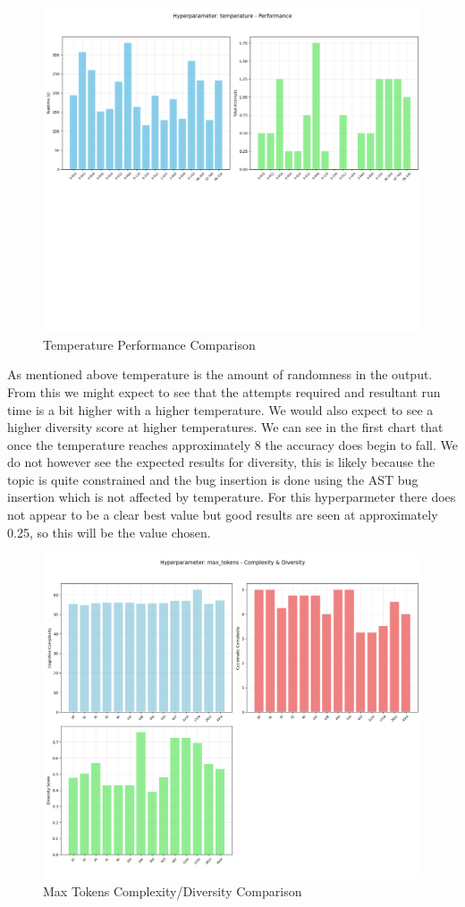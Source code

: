 \documentclass[12pt]{extarticle}
\begin{document}
\begin{figure}[H]
\centering
\includegraphics[width=0.7\linewidth]{Images/Hyperparam_temperature_Performance.png}
\caption{Temperature Performance Comparison}
\label{fig:Complexity_Comparison_Threads}
\end{figure}

As mentioned above temperature is the amount of randomness in the output. From this we might expect to see that the attempts required and resultant run time is a bit higher with a higher temperature. We would also expect to see a higher diversity score at higher temperatures. We can see in the first chart that once the temperature reaches approximately 8 the accuracy does begin to fall. We do not however see the expected results for diversity, this is likely because the topic is quite constrained and the bug insertion is done using the AST bug insertion which is not affected by temperature. For this hyperparmeter there does not appear to be a clear best value but good results are seen at approximately 0.25, so this will be the value chosen.

\begin{figure}[H]
\centering
\includegraphics[width=0.65\linewidth]{Images/Hyperparam_max_tokens_Complexity.png}
\caption{Max Tokens Complexity/Diversity Comparison}
\label{fig:Complexity_Comparison_Threads}
\end{figure}
\end{document}
